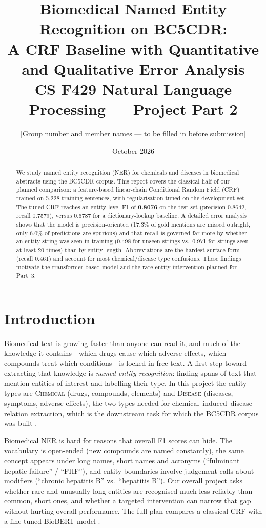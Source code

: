 \documentclass[10pt,a4paper]{article}
\title{\vspace{-1.2cm}\textbf{Biomedical Named Entity Recognition on BC5CDR:\\
A CRF Baseline with Quantitative and Qualitative Error Analysis}\\[4pt]
\large CS F429 Natural Language Processing --- Project Part 2}
\author{[Group number and member names --- to be filled in before submission]}
\date{October 2026}
\newcommand{\chem}{\textsc{Chemical}}
\newcommand{\dis}{\textsc{Disease}}
\begin{document}
\maketitle
\vspace{-0.8cm}

\begin{abstract}
\noindent We study named entity recognition (NER) for chemicals and diseases in biomedical abstracts using the BC5CDR corpus.
This report covers the classical half of our planned comparison: a feature-based linear-chain Conditional Random Field (CRF)
trained on 5{,}228 training sentences, with regularisation tuned on the development set. The tuned CRF reaches an entity-level
F1 of \textbf{0.8076} on the test set (precision 0.8642, recall 0.7579), versus 0.6787 for a dictionary-lookup baseline.
A detailed error analysis shows that the model is precision-oriented (17.3\% of gold mentions are missed outright, only 6.0\% of predictions are spurious)
and that recall is governed far more by whether an entity string was seen in training (0.498 for unseen strings vs.\ 0.971 for strings seen at least 20 times)
than by entity length. Abbreviations are the hardest surface form (recall 0.461) and account for most chemical/disease type confusions.
These findings motivate the transformer-based model and the rare-entity intervention planned for Part~3.
\end{abstract}

\section{Introduction}
Biomedical text is growing faster than anyone can read it, and much of the knowledge it contains---which drugs cause which adverse effects,
which compounds treat which conditions---is locked in free text. A first step toward extracting that knowledge is \emph{named entity recognition}:
finding spans of text that mention entities of interest and labelling their type. In this project the entity types are \chem{}
(drugs, compounds, elements) and \dis{} (diseases, symptoms, adverse effects), the two types needed for chemical--induced--disease
relation extraction, which is the downstream task for which the BC5CDR corpus was built \cite{li2016bc5cdr,wei2016cdr}.

Biomedical NER is hard for reasons that overall F1 scores can hide. The vocabulary is open-ended (new compounds are named constantly),
the same concept appears under long names, short names and acronyms (``fulminant hepatic failure'' / ``FHF''), and entity boundaries
involve judgement calls about modifiers (``chronic hepatitis B'' vs.\ ``hepatitis B''). Our overall project asks whether rare and
unusually long entities are recognised much less reliably than common, short ones, and whether a targeted intervention can narrow that gap
without hurting overall performance. The full plan compares a classical CRF with a fine-tuned BioBERT model \cite{lee2020biobert}.
\end{document}
